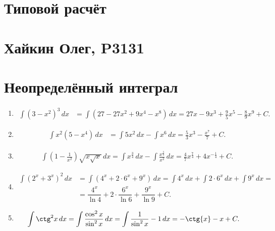 \documentclass[a4paper, 12pt]{article}
\newcommand{\xint}[1]{\int#1\,dx}
\begin{document}
 \begin{center}
  \section*{Типовой расчёт}
  \section*{Хайкин Олег, P3131}
 \end{center}
 
 \newpage
 \section{Неопределённый интеграл}
 \begin{enumerate}

 
  \item %
   \begin{align*}
      \xint{(3-x^2)^3} &= \xint{\left(27 - 27x^2  + 9x^4 - x^8\right)} =
      27x - 9x^3 + \frac{9}{5}x^5 - \frac{8}{9}x^9 + C
   .\end{align*}
 
  \item %
   \begin{align*}
      \xint{x^2  (5-x^4)} &= \xint{5x^2} - \xint{x^6} =
      \frac{5}{3}x^3 - \frac{x^7}{7} + C
   .\end{align*}
 
  \item %
    \begin{align*}
      \xint{(1-\frac{1}{x^2})\sqrt{x\sqrt{x}}} 
      =\xint{x^{\frac{3}{4}}} - \xint{\frac{x^{\frac{3}{4}}}{x^2}}
      =\frac{4}{7}x^{\frac{7}{4}} + 4x^{-\frac{1}{4}} + C
    .\end{align*}
 \item %
    \begin{align*}
      \xint{(2^x + 3^x)^2} 
      &= \xint{(4^x + 2 \cdot 6^x + 9^x)} = \xint{4^x} + \xint{2 \cdot 6^x} + \xint{9^x} = \\
      &= \dfrac{4^x}{\ln{4}} + 2 \cdot \dfrac{6^x}{\ln{6}} + \dfrac{9^x}{\ln{9}} + C
    .\end{align*}
  \item %
  \begin{align*}
    \xint{\ctg^2x} = \xint{\frac{\cos^2{x}}{\sin^2x}}
    &= \xint{\frac{1}{\sin^2x} - 1} = -\ctg{x} - x + C
  .\end{align*}
 

\end{enumerate}
\end{document}
